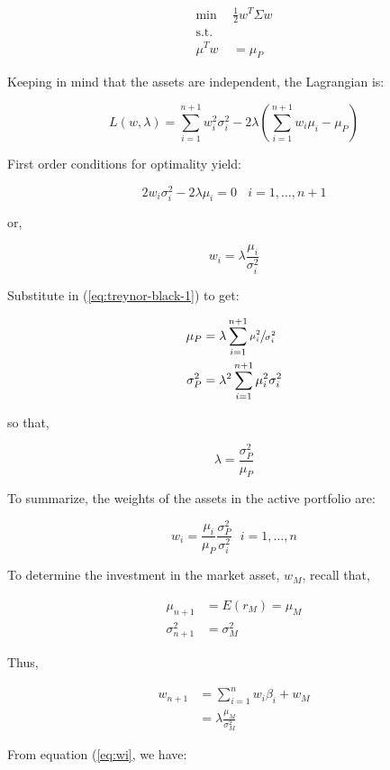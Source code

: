 \documentclass[
  11pt,
]{article}
\begin{document}
\[
\begin{aligned}
    \mbox{min} \ \ & \frac{1}{2} w^T \Sigma w  \\
    \mbox{s.t.} & \\
        \mu^Tw & = \mu_P
  \end{aligned}
\]

Keeping in mind that the assets are independent, the Lagrangian is:

\[
L(w, \lambda) = \sum_{i=1}^{n+1} w^2_i \sigma^2_i - 2\lambda \left( \sum_{i=1}^{n+1} w_i \mu_i - \mu_P \right)
\]

First order conditions for optimality yield:

\[
2 w_i \sigma^2_i - 2 \lambda \mu_i = 0 \ \ \ \ i=1, \ldots , n+1
\]

or,

\begin{equation}
w_i = \lambda \frac{\mu_i}{\sigma^2_i}
\label{eq:wi}
\end{equation}

Substitute in (\ref{eq:treynor-black-1}) to get:

\begin{align}
\mu_P &= \lambda \sum_{i=1}^{n+1} \sfrac{\mu^2_i}{\sigma^2_i} \label{eq:lambda-1} \\
\sigma^2_P &= \lambda^2 \sum_{i=1}^{n+1} \mu^2_i \sigma^2_i   \label{eq:lambda-2}
\end{align}

so that,

\[
\lambda = \frac{\sigma^2_P}{\mu_P}
\]

To summarize, the weights of the assets in the active portfolio are:

\[
w_i = \frac{\mu_i}{\mu_P} \frac{\sigma^2_P}{\sigma^2_i} \ \ \ i=1, \ldots, n
\]

To determine the investment in the market asset, \(w_M\), recall that,

\begin{align}
\mu_{n+1} &= E(r_M) = \mu_M \\
\sigma^2_{n+1} &= \sigma^2_M
\end{align}

Thus,

\begin{align}
w_{n+1} &= \sum_{i=1}^n w_i \beta_i + w_M \\
&= \lambda \frac{\mu_M}{\sigma^2_M}
\end{align}

From equation (\ref{eq:wi}, we have:
\end{document}
